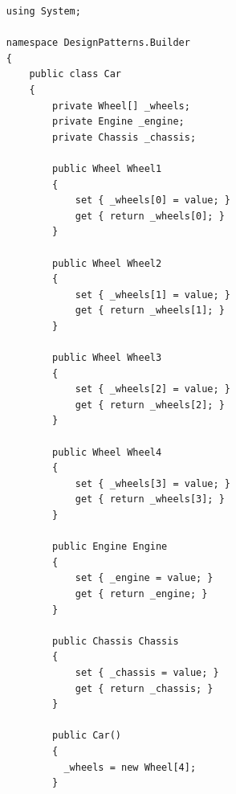 \documentclass[a4paper,10pt]{article}
\begin{document}
                    \begin{lstlisting}
                        using System;

                        namespace DesignPatterns.Builder
                        {
                            public class Car
                            {
                                private Wheel[] _wheels;
                                private Engine _engine;
                                private Chassis _chassis;
                        
                                public Wheel Wheel1
                                {
                                    set { _wheels[0] = value; }
                                    get { return _wheels[0]; }
                                }
                        
                                public Wheel Wheel2
                                {
                                    set { _wheels[1] = value; }
                                    get { return _wheels[1]; }
                                }
                        
                                public Wheel Wheel3
                                {
                                    set { _wheels[2] = value; }
                                    get { return _wheels[2]; }
                                }
                        
                                public Wheel Wheel4
                                {
                                    set { _wheels[3] = value; }
                                    get { return _wheels[3]; }
                                }
                        
                                public Engine Engine
                                {
                                    set { _engine = value; }
                                    get { return _engine; }
                                }
                        
                                public Chassis Chassis
                                {
                                    set { _chassis = value; }
                                    get { return _chassis; }
                                }
                        
                                public Car()
                                {
                                  _wheels = new Wheel[4];
                                }
                        

\end{lstlisting}
\end{document}
